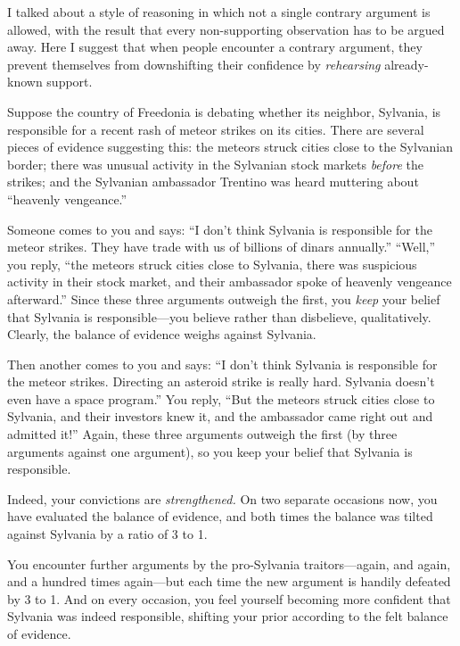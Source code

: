 {
 I talked about a style of reasoning in which not a single contrary
argument is allowed, with the result that every non-supporting
observation has to be argued away. Here I suggest that when people
encounter a contrary argument, they prevent themselves from
downshifting their confidence by \textit{rehearsing} already-known
support. }

{
 Suppose the country of Freedonia is debating whether its neighbor,
Sylvania, is responsible for a recent rash of meteor strikes on its
cities. There are several pieces of evidence suggesting this: the
meteors struck cities close to the Sylvanian border; there was unusual
activity in the Sylvanian stock markets \textit{before} the strikes;
and the Sylvanian ambassador Trentino was heard muttering about
``heavenly vengeance.''}

{
 Someone comes to you and says: ``I
don't think Sylvania is responsible for the meteor
strikes. They have trade with us of billions of dinars
annually.''
``Well,'' you reply,
``the meteors struck cities close to Sylvania, there
was suspicious activity in their stock market, and their ambassador
spoke of heavenly vengeance afterward.'' Since these
three arguments outweigh the first, you \textit{keep} your belief that
Sylvania is responsible---you believe rather than disbelieve,
qualitatively. Clearly, the balance of evidence weighs against
Sylvania.}

{
 Then another comes to you and says: ``I
don't think Sylvania is responsible for the meteor
strikes. Directing an asteroid strike is really hard. Sylvania
doesn't even have a space program.''
You reply, ``But the meteors struck cities close to
Sylvania, and their investors knew it, and the ambassador came right
out and admitted it!'' Again, these three arguments
outweigh the first (by three arguments against one argument), so you
keep your belief that Sylvania is responsible.}

{
 Indeed, your convictions are \textit{strengthened.} On two
separate occasions now, you have evaluated the balance of evidence, and
both times the balance was tilted against Sylvania by a ratio of 3 to
1.}

{
 You encounter further arguments by the pro-Sylvania
traitors---again, and again, and a hundred times again---but each time
the new argument is handily defeated by 3 to 1. And on every occasion,
you feel yourself becoming more confident that Sylvania was indeed
responsible, shifting your prior according to the felt balance of
evidence.}

